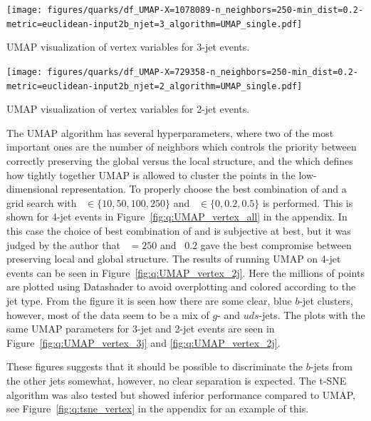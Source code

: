 \begin{marginfigure}
  \centerfloat
  \texttt{[image: figures/quarks/df\_UMAP-X=1078089-n\_neighbors=250-min\_dist=0.2-metric=euclidean-input2b\_njet=3\_algorithm=UMAP\_single.pdf]}
  \caption[UMAP visualization of vertex variables for 3-jet events]
          {UMAP visualization of vertex variables for 3-jet events.} 
  \label{fig:q:UMAP_vertex_3j}
\end{marginfigure}

\begin{marginfigure}
  \centerfloat
  \texttt{[image: figures/quarks/df\_UMAP-X=729358-n\_neighbors=250-min\_dist=0.2-metric=euclidean-input2b\_njet=2\_algorithm=UMAP\_single.pdf]}
  \caption[UMAP visualization of vertex variables for 2-jet events]
          {UMAP visualization of vertex variables for 2-jet events.} 
  \label{fig:q:UMAP_vertex_2j}
\end{marginfigure}

The UMAP algorithm has several hyperparameters, where two of the most important ones are the number of neighbors  which controls the priority between correctly preserving the global versus the local structure, and the  which defines how tightly together UMAP is allowed to cluster the points in the low-dimensional representation. To properly choose the best combination of  and  a grid search with ~$\in \{10, 50, 100, 250 \}$ and ~$\in \{0, 0.2, 0.5\}$ is performed. This is shown for 4-jet events in Figure~\ref{fig:q:UMAP_vertex_all} in the appendix. In this case the choice of best combination of  and  is subjective at best, but it was judged by the author that ~$=250$ and ~$0.2$ gave the best compromise between preserving local and global structure. The results of running UMAP on 4-jet events can be seen in Figure~\ref{fig:q:UMAP_vertex_2j}. Here the millions of points are plotted using Datashader \autocite{bednarDatashaderRevealingStructure2019} to avoid overplotting and colored according to the jet type. From the figure it is seen how there are some clear, blue $b$-jet clusters, however, most of the data seem to be a mix of $g$- and $uds$-jets. The plots with the same UMAP parameters for 3-jet and 2-jet events are seen in Figure~\ref{fig:q:UMAP_vertex_3j} and \ref{fig:q:UMAP_vertex_2j}. 

These figures suggests that it should be possible to discriminate the $b$-jets from the other jets somewhat, however, no clear separation is expected. The t-SNE algorithm was also tested but showed inferior performance compared to UMAP, see Figure~\ref{fig:q:tsne_vertex} in the appendix for an example of this.




